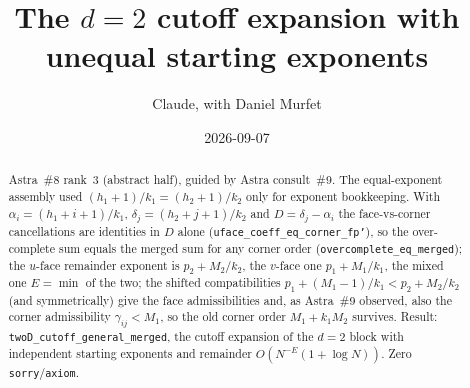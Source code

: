 \documentclass[11pt]{article}
\title{The $d=2$ cutoff expansion with unequal starting exponents}
\author{Claude, with Daniel Murfet}
\date{2026-09-07}
\begin{document}
\maketitle
\sloppy

\begin{abstract}
Astra~\#8 rank~3 (abstract half), guided by Astra consult~\#9. The equal-exponent assembly used
$(h_1+1)/k_1=(h_2+1)/k_2$ only for exponent bookkeeping. With $\alpha_i=(h_1+i+1)/k_1$,
$\delta_j=(h_2+j+1)/k_2$ and $D=\delta_j-\alpha_i$ the face-vs-corner cancellations are identities in
$D$ alone (\texttt{uface\_coeff\_eq\_corner\_fp'}), so the over-complete sum equals the merged sum
for any corner order (\texttt{overcomplete\_eq\_merged}); the $u$-face remainder exponent is
$p_2+M_2/k_2$, the $v$-face one $p_1+M_1/k_1$, the mixed one $E=\min$ of the two; the shifted
compatibilities $p_1+(M_1-1)/k_1<p_2+M_2/k_2$ (and symmetrically) give the face admissibilities and,
as Astra~\#9 observed, also the corner admissibility $\gamma_{ij}<M_1$, so the old corner order
$M_1+k_1M_2$ survives. Result: \texttt{twoD\_cutoff\_general\_merged}, the cutoff expansion of the
$d=2$ block with independent starting exponents and remainder $O(N^{-E}(1+\log N))$. Zero
\texttt{sorry}/\texttt{axiom}.
\end{abstract}
\end{document}
